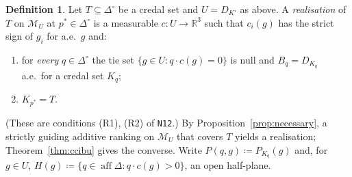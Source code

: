 \documentclass[11pt]{article}
\theoremstyle{definition}
\newtheorem{definition}[theorem]{Definition}
\theoremstyle{remark}
\newcommand{\R}{\mathbb R}
\newcommand{\Di}{\Delta^{\circ}}
\newcommand{\M}{\mathcal M}
\newcommand{\aff}{\operatorname{aff}}
\newcommand{\src}[1]{\texttt{#1}}
\begin{document}
\begin{definition}\label{def:realisation}
Let $T\subseteq\Di$ be a credal set and $U=D_{K'}$ as above. A \emph{realisation} of $T$ on $\M_U$ at $p^*\in\Di$ is a measurable $c:U\to\R^3$ such that $c_i(g)$ has the strict sign of $g_i$ for a.e.\ $g$ and:
\begin{enumerate}[leftmargin=*]
\item[\textbf{(BU)}] for \emph{every} $q\in\Di$ the tie set $\{g\in U:q\cdot c(g)=0\}$ is null and $B_q=D_{K_q}$ a.e.\ for a credal set $K_q$;
\item[\textbf{(TP)}] $K_{p^*}=T$.
\end{enumerate}
\end{definition}
(These are conditions (R1), (R2) of \src{N12}.) By Proposition~\ref{prop:necessary}, a strictly guiding additive ranking on $\M_U$ that covers $T$ yields a realisation; Theorem~\ref{thm:ccibu} gives the converse. Write $P(q,g)\coloneqq P_{K_q}(g)$ and, for $g\in U$, $H(g)\coloneqq\{q\in\aff\Delta:q\cdot c(g)>0\}$, an open half-plane.
\end{document}
